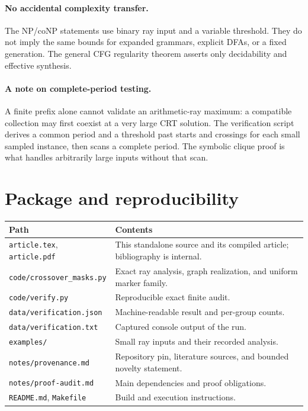 \documentclass[11pt,letterpaper]{article}
\theoremstyle{definition}
\theoremstyle{remark}
\begin{document}
\paragraph{No accidental complexity transfer.}
The NP/coNP statements use binary ray input and a variable threshold.
They do not imply the same bounds for expanded grammars, explicit DFAs,
or a fixed generation. The general CFG regularity theorem asserts only
decidability and effective synthesis.

\paragraph{A note on complete-period testing.}
A finite prefix alone cannot validate an arithmetic-ray maximum: a
compatible collection may first coexist at a very large CRT solution.
The verification script derives a common period and a threshold past
starts and crossings for each small sampled instance, then scans a
complete period. The symbolic clique proof is what handles arbitrarily
large inputs without that scan.

\section{Package and reproducibility}\label{ccc:cl:app:package}

\begin{center}\small
\begin{tabular}{@{}P{.40\textwidth}P{.54\textwidth}@{}}
\toprule
\textbf{Path} & \textbf{Contents}\\
\midrule
\texttt{article.tex}, \texttt{article.pdf} & This standalone source and
its compiled article; bibliography is internal.\\[3pt]
\texttt{code/crossover\_masks.py} & Exact ray analysis, graph realization,
and uniform marker family.\\[3pt]
\texttt{code/verify.py} & Reproducible exact finite audit.\\[3pt]
\texttt{data/verification.json} & Machine-readable result and per-group
counts.\\[3pt]
\texttt{data/verification.txt} & Captured console output of the run.\\[3pt]
\texttt{examples/} & Small ray inputs and their recorded analysis.\\[3pt]
\texttt{notes/provenance.md} & Repository pin, literature sources, and
bounded novelty statement.\\[3pt]
\texttt{notes/proof-audit.md} & Main dependencies and proof obligations.\\[3pt]
\texttt{README.md}, \texttt{Makefile} & Build and execution instructions.\\
\bottomrule
\end{tabular}
\end{center}
\end{document}

